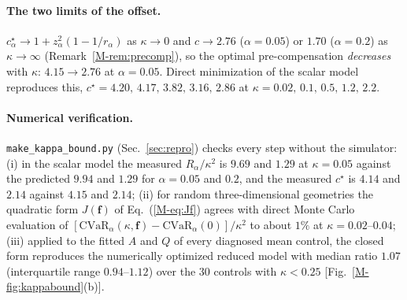 \documentclass[aps,pra,onecolumn,notitlepage,superscriptaddress,nofootinbib,floatfix]{revtex4-2}
\newcommand{\cvar}{\mathrm{CVaR}}
\begin{document}
\paragraph*{The two limits of the offset.} $c^\star_\alpha\to1+z_\alpha^2(1-1/r_\alpha)$
as $\kappa\to0$ and $c\to2.76$ ($\alpha=0.05$) or $1.70$ ($\alpha=0.2$) as
$\kappa\to\infty$ (Remark~\ref{M-rem:precomp}), so the optimal
pre-compensation \emph{decreases} with $\kappa$: $4.15\to2.76$ at
$\alpha=0.05$. Direct minimization of the scalar model reproduces this,
$c^\star=4.20,\,4.17,\,3.82,\,3.16,\,2.86$ at
$\kappa=0.02,\,0.1,\,0.5,\,1.2,\,2.2$.

\paragraph*{Numerical verification.} \texttt{make\_kappa\_bound.py}
(Sec.~\ref{sec:repro}) checks every step without the simulator: (i) in the scalar
model the measured $R_\alpha/\kappa^2$ is $9.69$ and $1.29$ at $\kappa=0.05$
against the predicted $9.94$ and $1.29$ for $\alpha=0.05$ and $0.2$, and the
measured $c^\star$ is $4.14$ and $2.14$ against $4.15$ and $2.14$;
(ii) for random three-dimensional geometries the quadratic form
$J(\mathbf f)$ of Eq.~(\ref{M-eq:Jf}) agrees with direct Monte Carlo
evaluation of $[\cvar_\alpha(\kappa,\mathbf f)-\cvar_\alpha(0)]/\kappa^2$ to
about $1\%$ at $\kappa=0.02$--$0.04$; (iii) applied to the fitted $A$ and $Q$
of every diagnosed mean control, the closed form reproduces the numerically
optimized reduced model with median ratio $1.07$ (interquartile range
$0.94$--$1.12$) over the 30 controls with $\kappa<0.25$
[Fig.~\ref{M-fig:kappabound}(b)].

\end{document}

